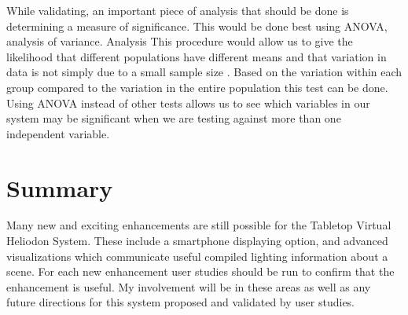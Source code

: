 While validating, an important piece of analysis that should be done is determining a measure of significance.  This would be done best using ANOVA, analysis of variance.  Analysis This procedure would allow us to give the likelihood that different populations have different means and that variation in data is not simply due to  a small sample size \cite{StatsBook}.  Based on the variation within each group compared to the variation in the entire population this test can be done.  Using ANOVA instead of other tests allows us to see which variables in our system may be significant when we are testing against more than one independent variable.


\section{Summary}
Many new and exciting enhancements are still possible for the Tabletop Virtual Heliodon System.  These include a smartphone displaying option, and advanced visualizations which communicate useful compiled lighting information about a scene.  For each new enhancement user studies should be run to confirm that the enhancement is useful.  My involvement will be in these areas as well as any future directions for this system proposed and validated by user studies.

\begin{comment}
\section{Other Related Research Areas}
Other open problems relating to the system are as follows.  Some are currently being investigated by other researchers in the lab.

\subsection{Color Calibration}
As we are using different models of projectors in our set-up as well as having a problem of projectors aging differently, there is noticeable differences in the the colors coming from projectors.  For example, if you project white from all projectors, there is a noticeable green tinge to one, red tinge to other, etc.  We have used some temporary solutions, such as measuring each color channel of the projectors and trying to compensate that way as well as just adjusting color using the projector menu.  Ideally this would be an automated process which could be run every week or so with effectively no human intervention.

\subsection{Projection Correction}
After interacting with the system for a session or two, it becomes apparent that the primitives we use are not perfectly straight walls and they are not at perfect right angles with the ground.  The system could auto-correct the projection if it were taking images while projecting.  The camera could detect where light was spilling across boundaries or not being projected enough and find a more accurate geometry.
\end{comment}

